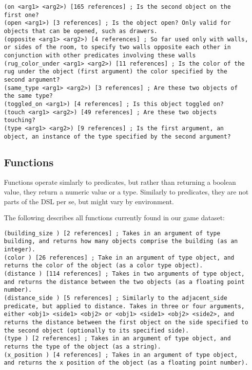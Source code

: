 \documentclass{article}
\begin{document}
\begin{lstlisting}
(on <arg1> <arg2>) [165 references] ; Is the second object on the first one?
(open <arg1>) [3 references] ; Is the object open? Only valid for objects that can be opened, such as drawers.
(opposite <arg1> <arg2>) [4 references] ; So far used only with walls, or sides of the room, to specify two walls opposite each other in conjunction with other predicates involving these walls
(rug_color_under <arg1> <arg2>) [11 references] ; Is the color of the rug under the object (first argument) the color specified by the second argument?
(same_type <arg1> <arg2>) [3 references] ; Are these two objects of the same type?
(toggled_on <arg1>) [4 references] ; Is this object toggled on?
(touch <arg1> <arg2>) [49 references] ; Are these two objects touching?
(type <arg1> <arg2>) [9 references] ; Is the first argument, an object, an instance of the type specified by the second argument?
\end{lstlisting}



\subsection{Functions}
Functions operate simlarly to predicates, but rather than returning a boolean value, they return a numeric value or a type. 
        Similarly to predicates, they are not parts of the DSL per se, but might vary by environment.

        The following describes all functions currently found in our game dataset:
        
\begin{lstlisting}
(building_size ) [2 references] ; Takes in an argument of type building, and returns how many objects comprise the building (as an integer).
(color ) [26 references] ; Take in an argument of type object, and returns the color of the object (as a color type object).
(distance ) [114 references] ; Takes in two arguments of type object, and returns the distance between the two objects (as a floating point number).
(distance_side ) [5 references] ; Similarly to the adjacent_side predicate, but applied to distance. Takes in three or four arguments, either <obj1> <side1> <obj2> or <obj1> <side1> <obj2> <side2>, and returns the distance between the first object on the side specified to the second object (optionally to its specified side).
(type ) [2 references] ; Takes in an argument of type object, and returns the type of the object (as a string).
(x_position ) [4 references] ; Takes in an argument of type object, and returns the x position of the object (as a floating point number).
\end{lstlisting}
\end{document}
